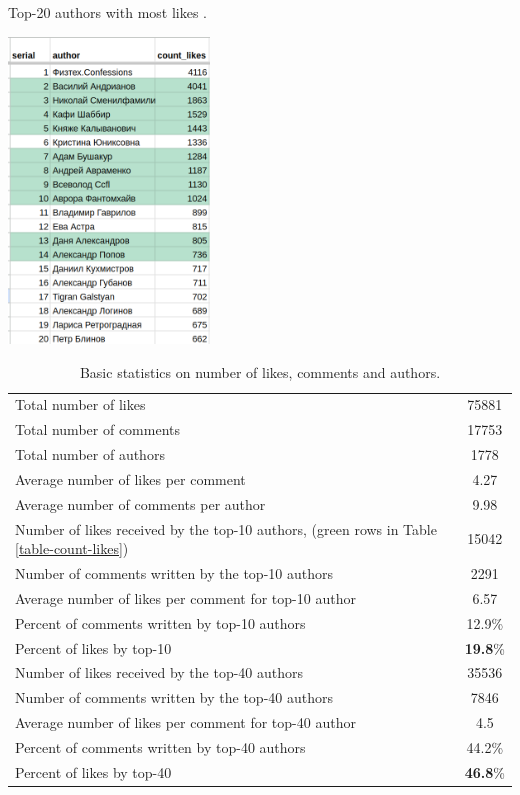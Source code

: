 \documentclass[
	11pt
] {article}
\begin{document}
	\begin{table}[H]
		\centering
		\caption{Top-20 authors with most likes \cite{sheet-count-likes}.}
		\label{table-count-likes}
		\includegraphics[width=0.4\textwidth]{table-count-likes-488}
	\end{table}

	\begin{table}[H]
		\centering
		\caption{Basic statistics on number of likes, comments and authors.}
		\label{table:basic-stats-number-likes-comments-author}
		\begin{tabular}{| p{5cm}  c |} %
			\hline
			Total number of likes & \num{75881} \\
			Total number of comments & \num{17753} \\
			Total number of authors & \num{1778} \\
			\hline
			Average number of likes per comment & \num{4.27} \\
			Average number of comments per author & \num{9.98} \\
			\hline
			\hline
			Number of likes received by the top-10 authors, (green rows in Table \ref{table-count-likes}) & \num{15042} \\
			Number of comments written by the top-10 authors & \num{2291} \\
			Average number of likes per comment for top-10 author & \num{6.57} \\
			\hline
			Percent of comments written by top-10 authors & \num{12.9}\% \\
			Percent of likes by top-10 & \textbf{\num{19.8}}\% \\
			\hline
			\hline
			Number of likes received by the top-40 authors & \num{35536} \\
			Number of comments written by the top-40 authors & \num{7846} \\
			Average number of likes per comment for top-40 author & \num{4.5} \\
			\hline
			Percent of comments written by top-40 authors & \num{44.2}\% \\
			Percent of likes by top-40 & \textbf{\num{46.8}}\% \\
			\hline
		\end{tabular}
	\end{table}
\end{document}
